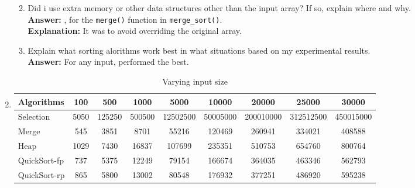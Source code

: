 \documentclass[12pt, a4paper]{article}
\newcommand{\squeezeup}{\vspace{-16pt}}%
\begin{document}
\begin{enumerate}[start=7]
\begin{enumerate}
        \squeezeup

        \item Did i use extra memory or other data structures other than the input array?
        If so, explain where and why. \\
        \hspace*{\fill} \textbf{Answer:} , for the \verb|merge()| function in \verb|merge_sort()|. \\
        \hspace*{\fill} \textbf{Explanation:} It was to avoid overriding the original array.

        \item Explain what sorting alorithms work best in what situations based on my experimental results. \\
        \hspace*{\fill} \textbf{Answer:} For any input,  performed the best.

    \end{enumerate}

    \addtocounter{enumi}{1}



    \newpage



    \item \begin{table}[h!]
      \centering
      \scriptsize
      \begin{tabular}{|l|c|c|c|c|c|c|c|c|}
        \hline
        Algorithms & 100 & 500 & 1000 & 5000 & 10000 & 20000 & 25000 & 30000 \\
        \hline\hline
        Selection & 5050 & 125250 & 500500 & 12502500 & 50005000 & 200010000 & 312512500 & 450015000 \\
        \hline
        Merge & 545 & 3851 & 8701 & 55216 & 120469 & 260941 & 334021 & 408588 \\
        \hline
        Heap & 1029 & 7430 & 16837 & 107699 & 235351 & 510753 & 654760 & 800764 \\
        \hline
        QuickSort-fp & 737 & 5375 & 12249 & 79154 & 166674 & 364035 & 463346 & 562793 \\
        \hline
        QuickSort-rp & 865 & 5800 & 13002 & 80548 & 176932 & 377251 & 486920 & 595238 \\
        \hline
      \end{tabular}
      \caption{Varying input size}
      \label{table:2}
    \end{table}
    

\end{enumerate}
\end{document}
